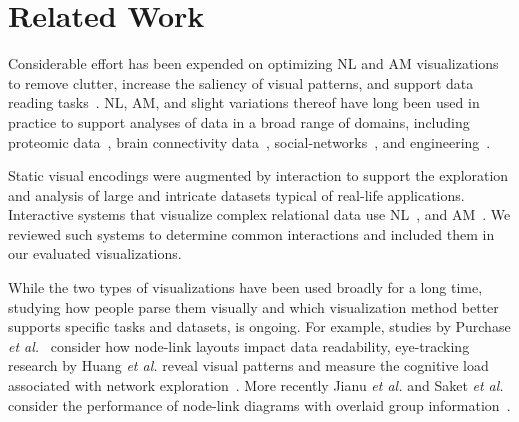 \section{Related Work}

Considerable effort has been expended on optimizing NL and AM visualizations to remove clutter, increase the saliency of visual patterns, and support data reading tasks~\cite{von2011visual}. NL, AM, and slight variations thereof have long been used in practice to support analyses of data in a broad range of domains, including proteomic data~\cite{shannon2003cytoscape,jourdan2003tool,barsky2007cerebral,jianu2014display}, brain connectivity data~\cite{alper2013weighted}, social-networks~\cite{viegas2004social}, and engineering~\cite{sedlmair2011cardiogram}.

Static visual encodings were augmented by interaction to support the exploration and analysis of large and intricate datasets typical of real-life applications. Interactive systems that visualize complex relational data use NL~\cite{auber2004tulip,bastian2009gephi,shannon2003cytoscape}, and AM~\cite{fekete2015reorder,behrisch2014visual,bach2014visualizing,blanch2015dendrogramix,rufiange2012treematrix,bezerianos2010geneaquilts,dinkla2012compressed,sheny2007path}. We reviewed such systems to determine common interactions and included them in our evaluated visualizations.

While the two types of visualizations have been used broadly for a long time, studying how people parse them visually and %
 which visualization method better supports specific tasks and datasets, is ongoing. For example, studies by Purchase {\it et al.}~\cite{purchase1997aesthetic,ware2002cognitive,purchase1996validating} consider how node-link layouts impact data readability, eye-tracking research by Huang {\it et al.} reveal visual patterns and measure the cognitive load associated with network exploration~\cite{huang2007using,huang2009measuring}. More recently Jianu {\it et al.} and Saket {\it et al.} consider the performance of node-link diagrams with overlaid group information~\cite{jianu2014display,saket2014node}.

